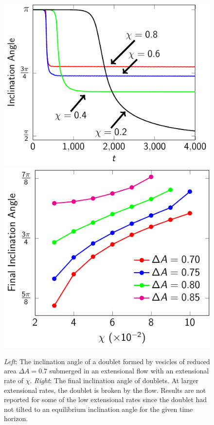 \documentclass[prf,superscriptaddress,showpacs]{revtex4-1}
\begin{document}
\begin{figure}[htp]
  \includegraphics[height=0.35\textwidth]{figs/adR4em1adS7em1_ra070_inclinationAngle.pdf}
  \includegraphics[height=0.35\textwidth]{figs/adR4em1adS7em1_finalInclinationAngle.pdf}
  \caption{\label{fig:extensionalInclinationAngle} {\em Left}: The
  inclination angle of a doublet formed by vesicles of reduced area
  $\Delta A = 0.7$ submerged in an extensional flow with an extensional
  rate of $\chi$.  {\em Right}: The final inclination angle of doublets.
  At larger extensional rates, the doublet is broken by the flow.
  Results are not reported for some of the low extensional rates since
  the doublet had not tilted to an equilibrium inclination angle for the
  given time horizon.}
\end{figure}
\end{document}
